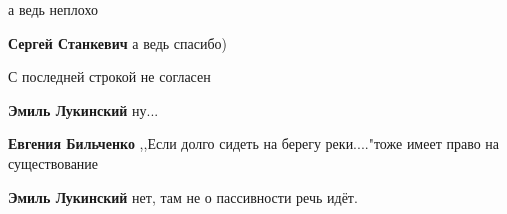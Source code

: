 \begin{itemize}
\begin{itemize}
\end{itemize}

 
а ведь неплохо

\begin{itemize}
 
\textbf{Сергей Станкевич} а ведь спасибо)
\end{itemize}

 
С последней строкой не согласен

\begin{itemize}
 
\textbf{Эмиль Лукинский} ну...

 
\textbf{Евгения Бильченко} ,,Если долго сидеть на берегу реки...."тоже имеет право на существование

 
\textbf{Эмиль Лукинский} нет, там не о пассивности речь идёт.


\end{itemize}
\end{itemize}
